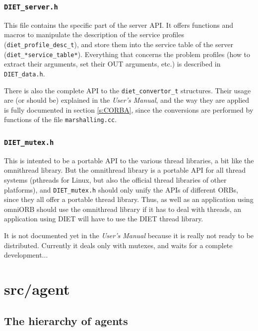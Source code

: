   \subsubsection{\tt DIET\_server.h}

  This file contains the specific part of the server API.
  It offers functions and macros to manipulate the description of the service
  profiles (\verb+diet_profile_desc_t+), and store them into the service table of
  the server (\verb+diet_*service_table*+). Everything that concerns the problem
  profiles (how to extract their arguments, set their OUT arguments, etc.) is
  described in \texttt{DIET\_data.h}.


  There is also the complete API to the \texttt{diet\_convertor\_t} structures.
  Their usage are (or should be) explained in the \textit{User's Manual}, and the
  way they are applied is fully documented in section \ref{s:CORBA}, since the
  conversions are performed by functions of the file \texttt{marshalling.cc}.

  \subsubsection{\tt DIET\_mutex.h}

  This is intented to be a portable API to the various thread libraries, a bit
  like the \textsf{omnithread} library. But the \textsf{omnithread} library is a
  portable API for all thread systems (pthreads for Linux, but also the official
      thread libraries of other platforms), and {\tt DIET\_mutex.h} should only unify
  the APIs of different ORBs, since they all offer a portable thread library.
  Thus, as well as an application using \textsf{omniORB} should use the
  \textsf{omnithread} library if it has to deal with threads, an application using
  DIET will have to use the DIET thread library.

  It is not documented yet in the \textit{User's Manual} because it is really not
  ready to be distributed. Currently it deals only with mutexes, and waits for a
  complete development...



  \section{\textsf{src/agent}}
  \label{s:agent}

  \subsection{The hierarchy of agents}

